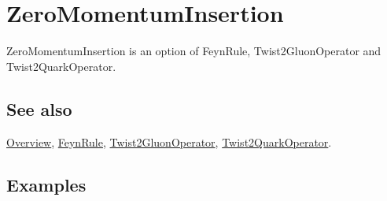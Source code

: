 \documentclass[../FeynCalcManual.tex]{subfiles}
\begin{document}
\hypertarget{zeromomentuminsertion}{%
\section{ZeroMomentumInsertion}\label{zeromomentuminsertion}}

ZeroMomentumInsertion is an option of FeynRule, Twist2GluonOperator and
Twist2QuarkOperator.

\subsection{See also}

\hyperlink{toc}{Overview}, \hyperlink{feynrule}{FeynRule},
\hyperlink{twist2gluonoperator}{Twist2GluonOperator},
\hyperlink{twist2quarkoperator}{Twist2QuarkOperator}.

\subsection{Examples}
\end{document}
